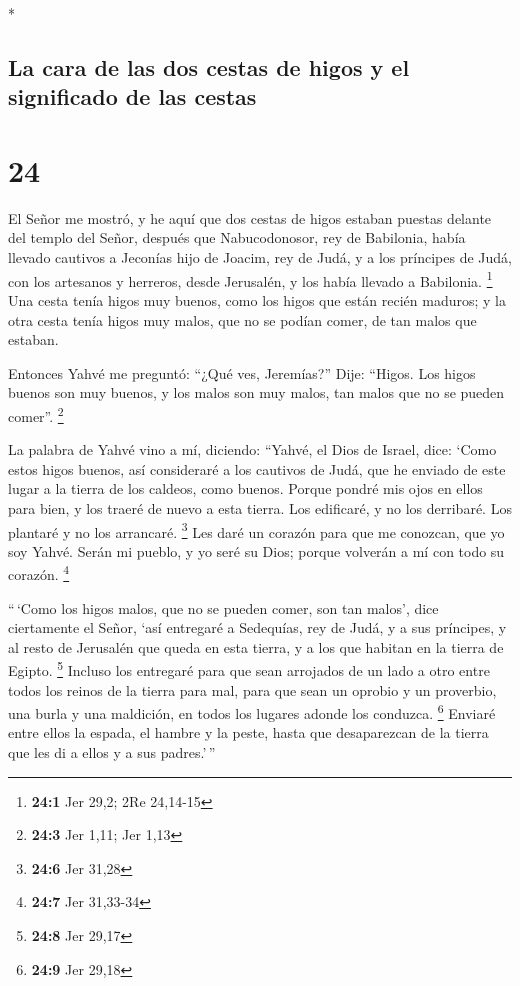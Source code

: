 \begin{paracol}{2}
\begin{otherlanguage}{english}
\end{otherlanguage}

\switchcolumn[0]*

\hypertarget{la-cara-de-las-dos-cestas-de-higos-y-el-significado-de-las-cestas}{%
\subsection{La cara de las dos cestas de higos y el significado de las
cestas}\label{la-cara-de-las-dos-cestas-de-higos-y-el-significado-de-las-cestas}}

\hypertarget{section-46}{%
\section{24}\label{section-46}}

 El Señor me mostró, y he aquí que dos cestas de higos
estaban puestas delante del templo del Señor, después que Nabucodonosor,
rey de Babilonia, había llevado cautivos a Jeconías hijo de Joacim, rey
de Judá, y a los príncipes de Judá, con los artesanos y herreros, desde
Jerusalén, y los había llevado a Babilonia. \footnote{\textbf{24:1} Jer
  29,2; 2Re 24,14-15}  Una cesta tenía higos muy buenos,
como los higos que están recién maduros; y la otra cesta tenía higos muy
malos, que no se podían comer, de tan malos que estaban.

 Entonces Yahvé me preguntó: ``¿Qué ves, Jeremías?'' Dije:
``Higos. Los higos buenos son muy buenos, y los malos son muy malos, tan
malos que no se pueden comer''. \footnote{\textbf{24:3} Jer 1,11; Jer
  1,13}

 La palabra de Yahvé vino a mí, diciendo: 
``Yahvé, el Dios de Israel, dice: `Como estos higos buenos, así
consideraré a los cautivos de Judá, que he enviado de este lugar a la
tierra de los caldeos, como buenos.  Porque pondré mis
ojos en ellos para bien, y los traeré de nuevo a esta tierra. Los
edificaré, y no los derribaré. Los plantaré y no los arrancaré.
\footnote{\textbf{24:6} Jer 31,28}  Les daré un corazón
para que me conozcan, que yo soy Yahvé. Serán mi pueblo, y yo seré su
Dios; porque volverán a mí con todo su corazón. \footnote{\textbf{24:7}
  Jer 31,33-34}

 ``\,`Como los higos malos, que no se pueden comer, son
tan malos', dice ciertamente el Señor, `así entregaré a Sedequías, rey
de Judá, y a sus príncipes, y al resto de Jerusalén que queda en esta
tierra, y a los que habitan en la tierra de Egipto. \footnote{\textbf{24:8}
  Jer 29,17}  Incluso los entregaré para que sean
arrojados de un lado a otro entre todos los reinos de la tierra para
mal, para que sean un oprobio y un proverbio, una burla y una maldición,
en todos los lugares adonde los conduzca. \footnote{\textbf{24:9} Jer
  29,18}  Enviaré entre ellos la espada, el hambre y la
peste, hasta que desaparezcan de la tierra que les di a ellos y a sus
padres.'\,''


\end{paracol}
